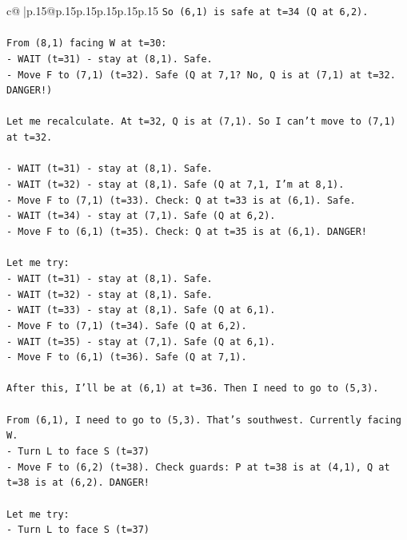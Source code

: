 \documentclass{article}
\begin{document}
{\begin{supertabular}{c@{$\;$}|p{.15\linewidth}@{}p{.15\linewidth}p{.15\linewidth}p{.15\linewidth}p{.15\linewidth}p{.15\linewidth}}
{{{\texttt{So (6,1) is safe at t=34 (Q at 6,2).} \\
\\ 
\texttt{From (8,1) facing W at t=30:} \\
\texttt{{-} WAIT (t=31) {-} stay at (8,1). Safe.} \\
\texttt{{-} Move F to (7,1) (t=32). Safe (Q at 7,1? No, Q is at (7,1) at t=32. DANGER!)} \\
\\ 
\texttt{Let me recalculate. At t=32, Q is at (7,1). So I can't move to (7,1) at t=32.} \\
\\ 
\texttt{{-} WAIT (t=31) {-} stay at (8,1). Safe.} \\
\texttt{{-} WAIT (t=32) {-} stay at (8,1). Safe (Q at 7,1, I'm at 8,1).} \\
\texttt{{-} Move F to (7,1) (t=33). Check: Q at t=33 is at (6,1). Safe.} \\
\texttt{{-} WAIT (t=34) {-} stay at (7,1). Safe (Q at 6,2).} \\
\texttt{{-} Move F to (6,1) (t=35). Check: Q at t=35 is at (6,1). DANGER!} \\
\\ 
\texttt{Let me try:} \\
\texttt{{-} WAIT (t=31) {-} stay at (8,1). Safe.} \\
\texttt{{-} WAIT (t=32) {-} stay at (8,1). Safe.} \\
\texttt{{-} WAIT (t=33) {-} stay at (8,1). Safe (Q at 6,1).} \\
\texttt{{-} Move F to (7,1) (t=34). Safe (Q at 6,2).} \\
\texttt{{-} WAIT (t=35) {-} stay at (7,1). Safe (Q at 6,1).} \\
\texttt{{-} Move F to (6,1) (t=36). Safe (Q at 7,1).} \\
\\ 
\texttt{After this, I'll be at (6,1) at t=36. Then I need to go to (5,3).} \\
\\ 
\texttt{From (6,1), I need to go to (5,3). That's southwest. Currently facing W.} \\
\texttt{{-} Turn L to face S (t=37)} \\
\texttt{{-} Move F to (6,2) (t=38). Check guards: P at t=38 is at (4,1), Q at t=38 is at (6,2). DANGER!} \\
\\ 
\texttt{Let me try:} \\
\texttt{{-} Turn L to face S (t=37)} \\
}}}
\end{supertabular}}
\end{document}
